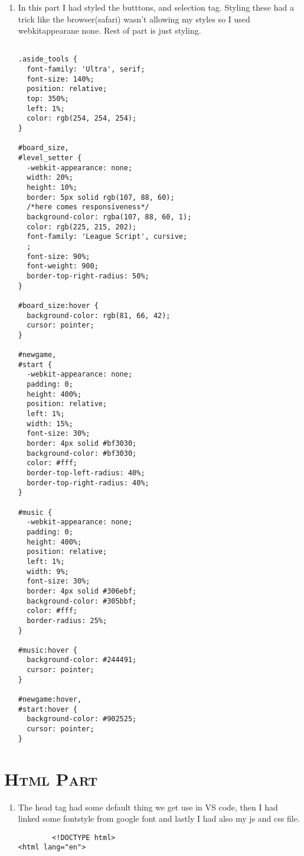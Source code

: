 \documentclass{article}
\begin{document}
\begin{flushleft}
\begin{enumerate}
\begin{verbatim}
}

#score1 {
  margin-right: 33%;
}

.score {
  background-color: rgb(111, 61, 25);
  border: 1px solid rgb(64, 120, 200);
  border-radius: 25%;
  text-decoration: none;
  color: #fff;
  padding-left: 1%;
}

#score2 {
  padding-right: 2%;
}

        \end{verbatim}
      \item 
      In this part I had styled the butttons, and selection tag. Styling these had a trick like the browser(safari) wasn't allowing my styles so I used \-webkit\-appearane\: none. Rest of part is just styling.
      \begin{verbatim}
          
.aside_tools {
  font-family: 'Ultra', serif;
  font-size: 140%;
  position: relative;
  top: 350%;
  left: 1%;
  color: rgb(254, 254, 254);
}

#board_size,
#level_setter {
  -webkit-appearance: none;
  width: 20%;
  height: 10%;
  border: 5px solid rgb(107, 88, 60);
  /*here comes responsiveness*/
  background-color: rgba(107, 88, 60, 1);
  color: rgb(225, 215, 202);
  font-family: 'League Script', cursive;
  ;
  font-size: 90%;
  font-weight: 900;
  border-top-right-radius: 50%;
}

#board_size:hover {
  background-color: rgb(81, 66, 42);
  cursor: pointer;
}

#newgame,
#start {
  -webkit-appearance: none;
  padding: 0;
  height: 400%;
  position: relative;
  left: 1%;
  width: 15%;
  font-size: 30%;
  border: 4px solid #bf3030;
  background-color: #bf3030;
  color: #fff;
  border-top-left-radius: 40%;
  border-top-right-radius: 40%;
}

#music {
  -webkit-appearance: none;
  padding: 0;
  height: 400%;
  position: relative;
  left: 1%;
  width: 9%;
  font-size: 30%;
  border: 4px solid #306ebf;
  background-color: #305bbf;
  color: #fff;
  border-radius: 25%;
}

#music:hover {
  background-color: #244491;
  cursor: pointer;
}

#newgame:hover,
#start:hover {
  background-color: #902525;
  cursor: pointer;
}
      \end{verbatim}
    \end{enumerate}
\section{\textsc{Html Part}}
\begin{enumerate}
    \item 
    The head tag had some default thing we get use \! in VS code, then I had linked some font\-style from google font and lastly I had also my js and css file.
    \begin{verbatim}
        <!DOCTYPE html>
<html lang="en">


\end{verbatim}
\end{enumerate}
\end{flushleft}
\end{document}
